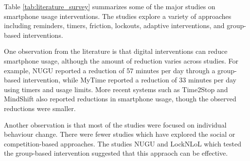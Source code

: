 \documentclass[11pt]{report}
\begin{document}
Table \ref{tab:literature_survey} summarizes some of the major studies on smartphone usage interventions. 
The studies explore a variety of approaches including reminders, timers, friction, 
lockouts, adaptive interventions, and group-based interventions.

One observation from the literature is that digital interventions can reduce smartphone 
usage, although the amount of reduction varies across studies. For example, NUGU reported 
a reduction of 57 minutes per day through a group-based intervention, while MyTime 
reported a reduction of 33 minutes per day using timers and usage limits. More recent 
systems such as Time2Stop and MindShift also reported reductions in smartphone usage, 
though the observed reductions were smaller.

Another observation is that most of the studies were focused on individual behaviour change. 
There were fewer studies which have explored the social or competition-based approaches. 
The studies NUGU and LockNLoL which tested the group-based intervention suggested that 
this appraoch can be effective.

\label{sec:literature}
\end{document}
